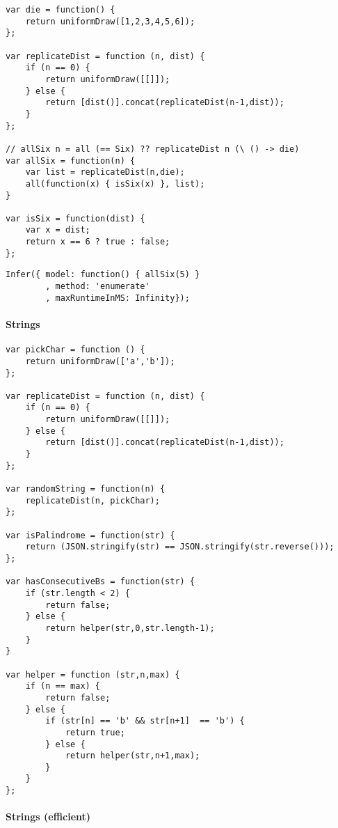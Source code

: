\begin{verbatim}
var die = function() {
    return uniformDraw([1,2,3,4,5,6]);
};

var replicateDist = function (n, dist) {
    if (n == 0) {
        return uniformDraw([[]]);
    } else {
        return [dist()].concat(replicateDist(n-1,dist));
    }
};

// allSix n = all (== Six) ?? replicateDist n (\ () -> die)
var allSix = function(n) {
    var list = replicateDist(n,die);
    all(function(x) { isSix(x) }, list);
}

var isSix = function(dist) {
    var x = dist;
    return x == 6 ? true : false;
};

\end{verbatim}

\begin{verbatim}
Infer({ model: function() { allSix(5) }
        , method: 'enumerate'
        , maxRuntimeInMS: Infinity});
\end{verbatim}

\paragraph{Strings}

\begin{verbatim}
var pickChar = function () {
    return uniformDraw(['a','b']);
};

var replicateDist = function (n, dist) {
    if (n == 0) {
        return uniformDraw([[]]);
    } else {
        return [dist()].concat(replicateDist(n-1,dist));
    }
};

var randomString = function(n) {
    replicateDist(n, pickChar);
};

var isPalindrome = function(str) {
    return (JSON.stringify(str) == JSON.stringify(str.reverse()));
};

var hasConsecutiveBs = function(str) {
    if (str.length < 2) {
        return false;
    } else {
        return helper(str,0,str.length-1);
    }
}

var helper = function (str,n,max) {
    if (n == max) {
        return false;
    } else {
        if (str[n] == 'b' && str[n+1]  == 'b') {
            return true;
        } else {
            return helper(str,n+1,max);
        }
    }
};
\end{verbatim}

\paragraph{Strings (efficient)}

